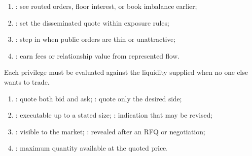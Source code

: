 \begin{taxonomy} 
\begin{enumerate}[label=\roman*.]
\setlength{\itemsep}{0pt}
\item {}: see routed orders, floor interest, or book imbalance earlier;
\item {}: set the disseminated quote within exposure rules;
\item {}: step in when public orders are thin or unattractive;
\item {}: earn fees or relationship value from represented flow.
\end{enumerate}
Each privilege must be evaluated against the liquidity supplied when no one else wants to trade.
\end{taxonomy}

\begin{taxonomy} 
\begin{enumerate}[label=\roman*.]
\setlength{\itemsep}{0pt}
\item {}: quote both bid and ask; : quote only the desired side;
\item {}: executable up to a stated size; : indication that may be revised;
\item {}: visible to the market; : revealed after an RFQ or negotiation;
\item {}: maximum quantity available at the quoted price.
\end{enumerate}
\end{taxonomy}





